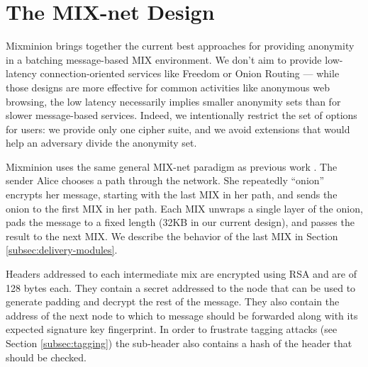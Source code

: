 \documentclass{llncs}
\begin{document}

\section{The MIX-net Design}
\label{sec:design}

Mixminion brings together the current best approaches for providing
anonymity in a batching message-based MIX environment. We don't aim
to provide low-latency connection-oriented services like Freedom
\cite{freedom} or Onion Routing \cite{goldschlag99} --- while those
designs are more effective for common activities like anonymous web
browsing, the low latency necessarily implies smaller anonymity sets
than for slower message-based services. Indeed, we intentionally
restrict the set of options for users: we provide only one
cipher suite, and we avoid extensions that would help an adversary
divide the anonymity set.

Mixminion uses the same general MIX-net paradigm as previous work
\cite{chaum-mix,mixmaster-attacks,babel}. The sender Alice chooses a
path through the network. She repeatedly ``onion'' encrypts her message,
starting with the last
MIX in her path, and sends the onion to the first MIX in her path. Each
MIX unwraps a single layer of the onion, pads the message to a fixed
length (32KB in our current design), and passes the result to the
next MIX. We describe the behavior of the last MIX in
Section \ref{subsec:delivery-modules}.


Headers addressed to each intermediate mix are encrypted using RSA
and are of 128 bytes each. They contain a secret addressed
to the node that can be used to generate padding and decrypt the rest
of the message. They also contain the address of the next node to 
which to message should be forwarded along with its expected signature 
key fingerprint. In order to frustrate tagging attacks (see
Section \ref{subsec:tagging}) the sub-header also contains a hash of
the header that
should be checked. 

\end{document}
